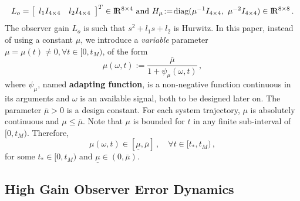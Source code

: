 \documentclass[letterpaper, 10 pt, conference]{ieeeconf}  %
\def\re{{\rm I}\! {\rm R}}
\theoremstyle{plain}
\theoremstyle{definition}
\theoremstyle{remark}
\newtheorem*{remark}{Remark}
\begin{document}
%
\begin{equation}
L_o=\left[\begin{array}{cc}  l_1 I_{4 \times 4} & l_2 I_{4 \times 4} \end{array} \right]^T \in \re^{8 \times 4} \ \mbox{and} \
H_\mu\!:=\!\mbox{diag}(\mu^{-1}  I_{4 \times 4}, \ \mu^{-2} I_{4 \times 4}) \in \re^{8 \times 8}\,.
\label{eq:defLhgo_and_Hhgo}
\end{equation}
%
%
%
The observer gain $L_o$ is such that $s^{2}+l_1
s+ l_2$ is Hurwitz. In this paper,
instead of using a constant $\mu$, we introduce a {\em variable}
parameter $\mu=\mu(t)\neq\!0, \forall t\in[0,t_M)$, %
of the form
%
\begin{equation}
\mu(\omega,t):=\frac{\bar{\mu}}{1+
\psi_\mu(\omega,t)}\,,\label{eq:def_mu}
\end{equation}
%
where $\psi_\mu$, named \textbf{adapting function}, is a
non-negative function continuous in its
arguments and $\omega$ is an available signal, both to be designed later on. The parameter $\bar{\mu}\!>\!0$ is a design constant. For each
system trajectory, $\mu$ is absolutely continuous and
$\mu\!\leq\!\bar{\mu}$. Note that $\mu$ is bounded for $t$ in any
finite sub-interval of $[0,t_M)$. Therefore,
%
\begin{equation}
\mu(\omega,t)\in[\underline{\mu},\bar{\mu}]\,, \quad \forall
t\!\in\![t_*,t_M)\,, \label{eq:P3}
\end{equation}
%
for some $t_* \in [0,t_M)$ and
$\underline{\mu}\!\in\!(0,\bar{\mu})$. 



\subsection{High Gain Observer Error Dynamics}
\end{document}

